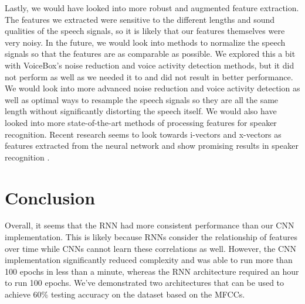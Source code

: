 \documentclass{article}
\begin{document}
Lastly, we would have looked into more robust and augmented feature extraction.
The features we extracted were sensitive to the different lengths and sound qualities of the speech signals, so it is likely that our features themselves were very noisy.
In the future, we would look into methods to normalize the speech signals so that the features are as comparable as possible.
We explored this a bit with VoiceBox’s noise reduction and voice activity detection methods, but it did not perform as well as we needed it to and did not result in better performance.
We would look into more advanced noise reduction and voice activity detection as well as optimal ways to resample the speech signals so they are all the same length without significantly distorting the speech itself.
We would also have looked into more state-of-the-art methods of processing features for speaker recognition.
Recent research seems to look towards i-vectors and x-vectors as features extracted from the neural network and show promising results in speaker recognition \cite{ivector, xvector}.


\section{Conclusion}
\label{sec:conclusion}

Overall, it seems that the RNN had more consistent performance than our CNN implementation.
This is likely because RNNs consider the relationship of features over time while CNNs cannot learn these correlations as well.
However, the CNN implementation significantly reduced complexity and was able to run more than 100 epochs in less than a minute, whereas the RNN architecture required an hour to run 100 epochs.
We’ve demonstrated two architectures that can be used to achieve 60\% testing accuracy on the dataset based on the MFCCs.



\end{document}
